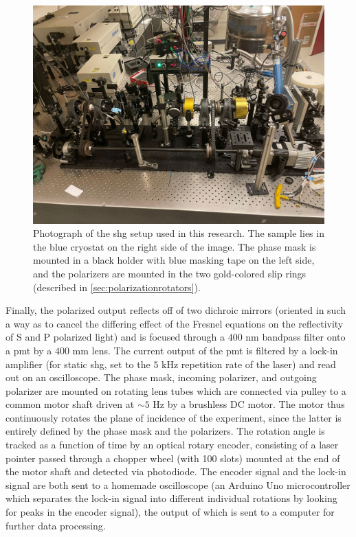 \begin{figure}
\includegraphics[width=\textwidth]{gfx/ch3/pdf/setup_real.pdf}
\caption[Photograph of the SHG setup.]{\label{fig:setup_real}Photograph of the \gls{shg} setup used in this research.
The sample lies in the blue cryostat on the right side of the image.
The phase mask is mounted in a black holder with blue masking tape on the left side, and the polarizers are mounted in the two gold-colored slip rings (described in \cref{sec:polarizationrotators}).}
\end{figure}

Finally, the polarized output reflects off of two dichroic mirrors (oriented in such a way as to cancel the differing effect of the Fresnel equations on the reflectivity of S and P polarized light) and is focused through a $400$ \si{nm} bandpass filter onto a \gls{pmt} by a $400$ \si{mm} lens.
The current output of the \gls{pmt} is filtered by a lock-in amplifier (for static \gls{shg}, set to the $5$ \si{kHz} repetition rate of the laser) and read out on an oscilloscope.
The phase mask, incoming polarizer, and outgoing polarizer are mounted on rotating lens tubes which are connected via pulley to a common motor shaft driven at $\sim 5$ \si{Hz} by a brushless DC motor.
The motor thus continuously rotates the plane of incidence of the experiment, since the latter is entirely defined by the phase mask and the polarizers.
The rotation angle is tracked as a function of time by an optical rotary encoder, consisting of a laser pointer passed through a chopper wheel (with 100 slots) mounted at the end of the motor shaft and detected via photodiode.
The encoder signal and the lock-in signal are both sent to a homemade oscilloscope (an Arduino Uno microcontroller which separates the lock-in signal into different individual rotations by looking for peaks in the encoder signal), the output of which is sent to a computer for further data processing.

